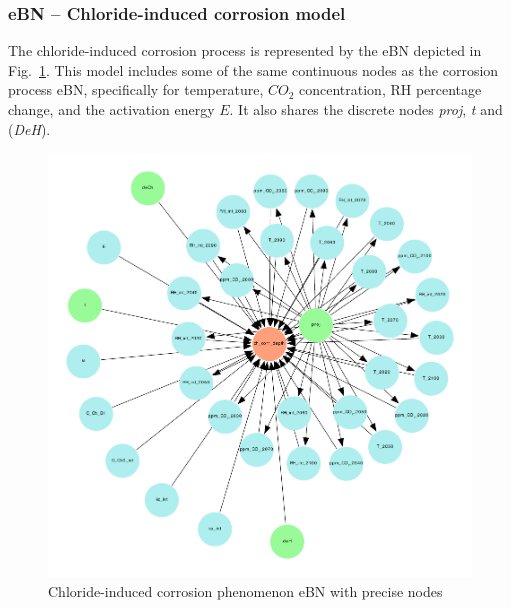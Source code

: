 \subsubsection{eBN -- Chloride-induced corrosion model}\label{ebn_chloride_section}
The chloride-induced corrosion process is represented by the eBN depicted in Fig.~\ref{chloride_ebn}. This model includes some of the same continuous nodes as the corrosion process eBN, specifically for temperature, $CO_2$ concentration, RH percentage change, and the activation energy $E$. It also shares the  discrete nodes \textit{proj}, \textit{t} and (\textit{DeH}).
\begin{figure}[H]
    \centering
    \includegraphics[width=\linewidth]{imgs/pdfs/9_chloride_ebn.pdf}
    \caption{Chloride-induced corrosion phenomenon eBN with precise nodes}\label{chloride_ebn}
\end{figure}
